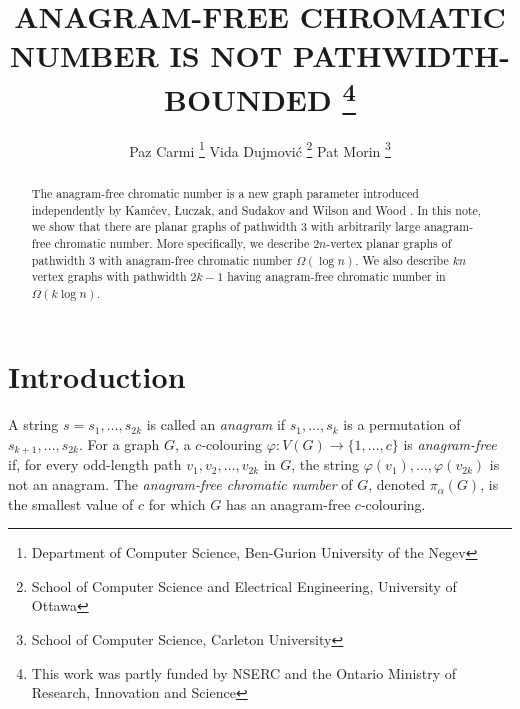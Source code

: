 \documentclass{patmorin}
\title{\MakeUppercase{Anagram-Free Chromatic Number is not Pathwidth-Bounded}%
   \thanks{This work was partly funded by NSERC and the Ontario Ministry of
    Research, Innovation and Science}}
\author{Paz Carmi%
   \thanks{Department of Computer Science,
           Ben-Gurion University of the Negev}\quad%
   Vida Dujmović%
   \thanks{School of Computer Science and Electrical Engineering, 
           University of Ottawa}\quad%
   Pat Morin%
   \thanks{School of Computer Science, Carleton University}}%
\begin{document}
\maketitle
%
\begin{abstract}
  The anagram-free chromatic number is a new graph parameter
  introduced independently by Kamčev, Łuczak, and Sudakov
  \cite{kamcev.luczak.ea:anagram-free} and Wilson and Wood
  \cite{wilson.wood:anagram-free}.  In this note, we show that there
  are planar graphs of pathwidth 3 with arbitrarily large anagram-free
  chromatic number.  More specifically, we describe $2n$-vertex planar
  graphs of pathwidth 3 with anagram-free chromatic number $\Omega(\log n)$.
  We also describe $kn$ vertex graphs with pathwidth $2k-1$ having
  anagram-free chromatic number in $\Omega(k\log n)$.
\end{abstract}
%
%


\section{Introduction}

A string $s=s_1,\ldots,s_{2k}$ is called an \emph{anagram} if
$s_1,\ldots,s_k$ is a permutation of $s_{k+1},\ldots,s_{2k}$.
For a graph $G$, a $c$-colouring $\varphi:V(G)\to\{1,\ldots,c\}$ is
\emph{anagram-free} if, for every odd-length path $v_1,v_2,\ldots,v_{2k}$
in $G$, the string $\varphi(v_1),\ldots,\varphi(v_{2k})$ is not an
anagram.  The \emph{anagram-free chromatic number} of $G$, denoted
$\pi_\alpha(G)$, is the smallest value of $c$ for which $G$ has an
anagram-free $c$-colouring.
\end{document}
